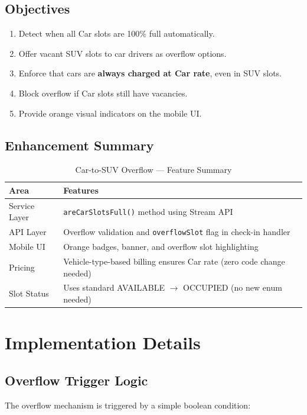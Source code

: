 \documentclass[12pt,a4paper]{article}
\begin{document}
\subsection{Objectives}
\begin{enumerate}[noitemsep]
    \item Detect when all Car slots are 100\% full automatically.
    \item Offer vacant SUV slots to car drivers as overflow options.
    \item Enforce that cars are \textbf{always charged at Car rate}, even in SUV slots.
    \item Block overflow if Car slots still have vacancies.
    \item Provide orange visual indicators on the mobile UI.
\end{enumerate}

\subsection{Enhancement Summary}

\begin{table}[H]
\centering
\caption{Car-to-SUV Overflow — Feature Summary}
\begin{tabularx}{\textwidth}{|l|X|}
\hline
\textbf{Area} & \textbf{Features} \\
\hline
Service Layer & \texttt{areCarSlotsFull()} method using Stream API \\
\hline
API Layer & Overflow validation and \texttt{overflowSlot} flag in check-in handler \\
\hline
Mobile UI & Orange badges, banner, and overflow slot highlighting \\
\hline
Pricing & Vehicle-type-based billing ensures Car rate (zero code change needed) \\
\hline
Slot Status & Uses standard AVAILABLE $\rightarrow$ OCCUPIED (no new enum needed) \\
\hline
\end{tabularx}
\end{table}

\section{Implementation Details}

\subsection{Overflow Trigger Logic}
The overflow mechanism is triggered by a simple boolean condition:
\end{document}

